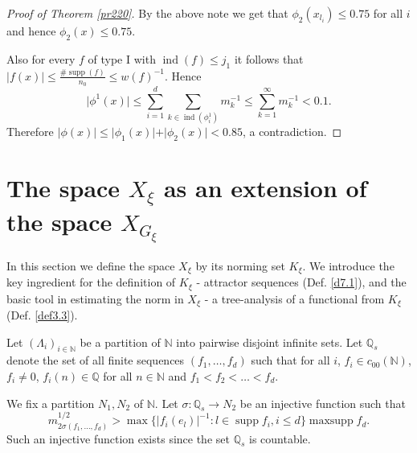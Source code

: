 \documentclass[a4paper]{amsart}
\theoremstyle{plain}
\newcommand{\N}{\mathbb{N}}
\newcommand{\Q}{\mathbb{Q}}
\DeclareMathOperator{\maxsupp}{maxsupp}
\DeclareMathOperator{\supp}{supp}
\DeclareMathOperator{\ind}{ind}
\DeclareMathOperator{\inde}{ind}
\begin{document}
\begin{proof}[Proof of Theorem \ref{pr220}]
By the above note we get that $\phi_{2}(x_{l_i})\leq 0.75$ for all $i$ and hence  $\phi_{2}(x)\leq 0.75$.


Also  for every $f$ of type I with  $\ind(f)\leq j_1$ it follows that $\vert
f(x)\vert\leq\frac{\#\supp(f)}{n_{0}}\leq w(f)^{-1}$. Hence
$$\vert \phi^{1}(x)\vert\leq  \sum_{i=1}^{d}\sum_{k\in\inde(\phi_{i}^{1})}m_{k}^{-1}\leq\sum_{k=1}^{\infty}m_{k}^{-1}<0.1.
$$
Therefore  $\vert \phi(x)\vert\leq\vert \phi_{1}(x)\vert+\vert\phi_{2}(x)\vert<0.85$, a contradiction.
\end{proof}

\section{The space $X_{\xi}$ as an extension of the space $X_{G_{\xi}}$}\label{sec7}
In this section we define the space $X_{\xi}$ by its norming set $K_{\xi}$. We introduce the key
ingredient for the definition of $K_{\xi}$ - attractor sequences (Def. \ref{d7.1}), and the basic
tool in estimating the norm in $X_{\xi}$ - a tree-analysis of a functional from $K_{\xi}$ (Def.
\ref{def3.3}).

Let $(\Lambda_{i})_{i\in\N}$ be a partition of $\N$ into pairwise disjoint  infinite
sets. Let $\Q_{s}$ denote the set of all finite sequences $(f_{1},\dots, f_{d})$ such
that for all $i$, $f_{i}\in c_{00}(\N)$, $f_{i}\ne 0$, $f_{i}(n)\in\Q$ for all $n\in\N$
and $f_{1}<f_{2}<\dots<f_{d}$.

We fix a partition $N_{1},N_{2}$ of  $\N$.  Let $\sigma:\Q_{s}\to N_{2}$ be an injective  function such that
$$
m^{1/2}_{2\sigma(f_{1},\dots,f_{d})}>\max\{\vert f_{i}(e_{l})\vert^{-1}: l\in\supp f_{i},i\leq d\}\maxsupp f_{d}.
$$
Such an injective function exists since the set $\Q_{s}$ is countable.
\end{document}
